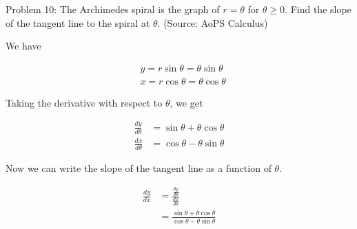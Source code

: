 Problem 10: The Archimedes spiral is the graph of $r = \theta$ for $\theta \geq 0$. Find the slope of the tangent line to the spiral at $\theta$. (Source: AoPS Calculus)

We have 

\begin{align*}
& y = r \sin \theta = \theta \sin \theta \\
& x = r \cos \theta = \theta \cos \theta
\end{align*}

Taking the derivative with respect to $\theta$, we get

\begin{align*}
\frac{dy}{d\theta} &= \sin \theta + \theta \cos \theta \\
\frac{dx}{d\theta} &= \cos \theta - \theta \sin \theta
\end{align*}

Now we can write the slope of the tangent line as a function of $\theta$.

\begin{align*}
\frac{dy}{dx} &= \frac{\frac{dy}{d\theta}}{\frac{dx}{d\theta}} \\
&= \boxed{\frac{\sin \theta + \theta \cos \theta}{\cos \theta - \theta \sin \theta}}
\end{align*}
